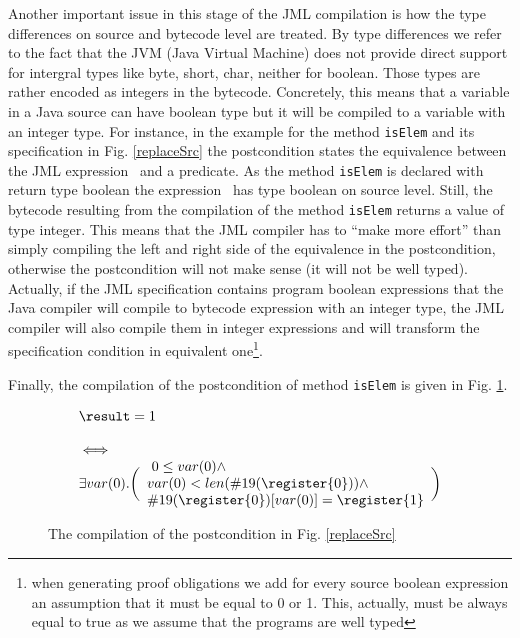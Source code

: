\begin{enumerate}
Another important issue in this stage of the JML compilation is how the type differences on source and bytecode level are treated. 
By type differences we refer to the fact that the JVM (Java Virtual Machine) does not provide direct support for intergral types like byte, short, char, neither for boolean. Those types are rather encoded as integers in the bytecode. Concretely, this means that a variable in a Java source can have boolean type but it will be compiled to a variable with
an integer type. For instance, in the example for the method 
\texttt{isElem} and its specification in Fig. \ref{replaceSrc}  the postcondition states the equivalence between the JML expression  
\result \ and a predicate. As the method \texttt{isElem} is declared with return type boolean the expression \result \ has type boolean on source level. 
Still, the bytecode resulting from the compilation of the method  \texttt{isElem} returns a value of type integer. This means that the JML compiler has to 
``make more effort'' than simply compiling the left and right side of the equivalence in the postcondition, otherwise the postcondition will not make sense
 (it will not be well typed). Actually, 
if the JML specification contains program boolean expressions that the Java compiler will compile to bytecode expression with an integer type, the JML compiler 
will also compile them in integer expressions and will transform the specification condition in equivalent 
one\footnote{when generating proof obligations we add for every source boolean expression an assumption that it
 must be equal to 0 or 1. This, actually, must be always
equal to true as we assume that the programs are well typed}.  

Finally, the compilation of the postcondition of method \texttt{isElem} is given in Fig. \ref{postCompile}.
\begin{figure}[tb]
 $$\begin{array}{l}
         \result = 1 \\
          \\ 
         \iff \\ 
         \exists  var(0) .
           \biggl(\begin{array}{l} \ 0 \leq var(0) \wedge\\ 
             var(0) < len(\#19(\register{0})) \wedge \\
             \#19(\register{0})[var(0)] = \register{1} 
         \end{array} \biggr) 
   \end{array}
$$
\caption{The compilation of the postcondition in Fig. \ref{replaceSrc}}
\label{postCompile}
\end{figure}


\end{enumerate}
